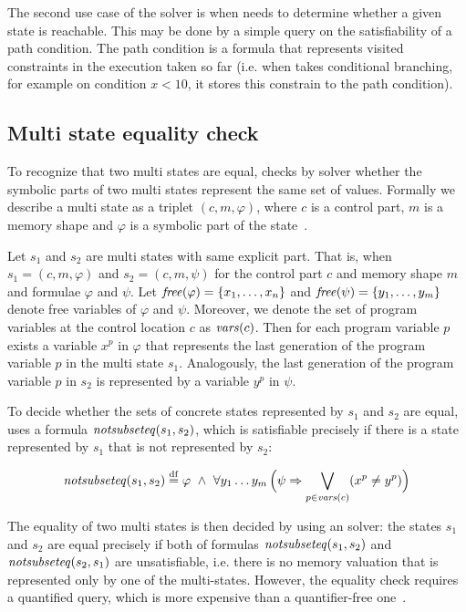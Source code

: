 The second use case of the \SMT solver is when \SymDIVINE needs to determine
whether a given state is reachable. This may be done by a simple query on the
satisfiability of a path condition. The path condition is a formula that
represents visited constraints in the execution taken so far (i.e.  when
\SymDIVINE takes conditional branching, for example on condition $x < 10$, it
stores this constrain to the path condition).

\subsection{Multi state equality check}\label{subsec:equality}

To recognize that two multi states are equal, \SymDIVINE checks by \SMT solver
whether the symbolic parts of two multi states represent the same set of values.
Formally we describe a multi state as a triplet $(c, m, \varphi)$, where
$c$ is a control part, $m$ is a memory shape and $\varphi$ is a symbolic part of
the state~\cite{Jonas17}.

Let $s_1$ and $s_2$ are multi states with same explicit part. That is, when $s_1
= (c, m, \varphi)$ and $s_2 = (c, m, \psi)$ for the control part $c$ and memory
shape $m$ and formulae $\varphi$ and $\psi$. Let $\mathit{free}(\varphi) = \{x_1, \dots,
x_n\}$ and $\mathit{free}(\psi) = \{ y_1, \dots, y_m\}$ denote free variables of
$\varphi$ and $\psi$. Moreover, we denote the set of program variables at the
control location $c$ as $\mathit{vars}(c)$. Then for each program variable $p$ exists a
variable $x^p$ in $\varphi$ that represents the last generation of the program
variable $p$ in the multi state $s_1$. Analogously, the last generation of the
program variable $p$ in $s_2$ is represented by a variable $y^p$ in $\psi$.

To decide whether the sets of concrete states represented by $s_1$ and $s_2$ are
equal, \SymDIVINE uses a formula $\mathit{notsubseteq}(s_1, s_2)$, which is satisfiable
precisely if there is a state represented by $s_1$ that is not represented by
$s_2$:

\[
  \mathit{notsubseteq}(s_1, s_2) \stackrel{\mathrm{df}}{=} \varphi~\land~ \forall y_1 \ldots y_m
  \, \Big ( \psi \Rightarrow \bigvee_{p \in \mathit{vars}(c)} (x^p \not =
  y^p) \Big)
\]

The equality of two multi states is then decided by using an \SMT solver: the
states $s_1$ and $s_2$ are equal precisely if both of formulas
$\mathit{notsubseteq}(s_1, s_2)$ and $\mathit{notsubseteq}(s_2, s_1)$ are unsatisfiable, i.e.
there is no memory valuation that is represented only by one of the
multi-states. However, the equality check requires a quantified \SMT query,
which is more expensive than a quantifier-free one~\cite{Jonas17}.

